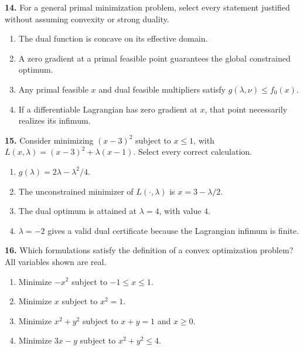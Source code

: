 \documentclass[11pt,a4paper]{article}
\begin{document}
\par\noindent\begin{minipage}{\linewidth}
\textbf{14.} For a general primal minimization problem, select every statement justified without assuming convexity or strong duality.
\begin{enumerate}[label=(\Alph*),leftmargin=8mm,itemsep=2pt,topsep=2pt]
\item The dual function is concave on its effective domain.
\item A zero gradient at a primal feasible point guarantees the global constrained optimum.
\item Any primal feasible \(x\) and dual feasible multipliers satisfy \(g(\lambda,\nu)\le f_0(x)\).
\item If a differentiable Lagrangian has zero gradient at \(x\), that point necessarily realizes its infimum.
\end{enumerate}

\end{minipage}\par\vspace{3mm}
\par\noindent\begin{minipage}{\linewidth}
\textbf{15.} Consider minimizing \((x-3)^2\) subject to \(x\le1\), with \(L(x,\lambda)=(x-3)^2+\lambda(x-1)\). Select every correct calculation.
\begin{enumerate}[label=(\Alph*),leftmargin=8mm,itemsep=2pt,topsep=2pt]
\item \(g(\lambda)=2\lambda-\lambda^2/4\).
\item The unconstrained minimizer of \(L(\cdot,\lambda)\) is \(x=3-\lambda/2\).
\item The dual optimum is attained at \(\lambda=4\), with value \(4\).
\item \(\lambda=-2\) gives a valid dual certificate because the Lagrangian infimum is finite.
\end{enumerate}

\end{minipage}\par\vspace{3mm}
\par\noindent\begin{minipage}{\linewidth}
\textbf{16.} Which formulations satisfy the definition of a convex optimization problem? All variables shown are real.
\begin{enumerate}[label=(\Alph*),leftmargin=8mm,itemsep=2pt,topsep=2pt]
\item Minimize \(-x^2\) subject to \(-1\le x\le1\).
\item Minimize \(x\) subject to \(x^2=1\).
\item Minimize \(x^2+y^2\) subject to \(x+y=1\) and \(x\ge0\).
\item Minimize \(3x-y\) subject to \(x^2+y^2\le4\).
\end{enumerate}

\end{minipage}\par\vspace{3mm}
\end{document}
